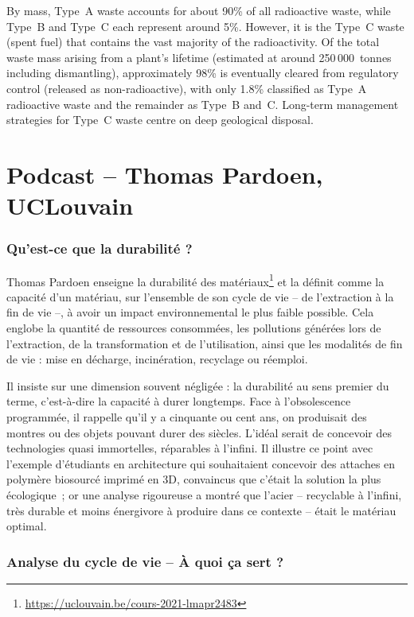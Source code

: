 By mass, Type~A waste accounts for about 90\% of all radioactive waste, while Type~B and Type~C each represent around 5\%. However, it is the Type~C waste (spent fuel) that contains the vast majority of the radioactivity. Of the total waste mass arising from a plant's lifetime (estimated at around 250\,000~tonnes including dismantling), approximately 98\% is eventually cleared from regulatory control (released as non-radioactive), with only 1.8\% classified as Type~A radioactive waste and the remainder as Type~B and~C. Long-term management strategies for Type~C waste centre on deep geological disposal.


\section{Podcast -- Thomas Pardoen, UCLouvain}

\subsubsection{Qu'est-ce que la durabilité ?}

Thomas Pardoen enseigne la durabilité des matériaux\footnote{\url{https://uclouvain.be/cours-2021-lmapr2483}} et la définit comme la capacité d'un matériau, sur l'ensemble de son cycle de vie -- de l'extraction à la fin de vie --, à avoir un impact environnemental le plus faible possible. Cela englobe la quantité de ressources consommées, les pollutions générées lors de l'extraction, de la transformation et de l'utilisation, ainsi que les modalités de fin de vie : mise en décharge, incinération, recyclage ou réemploi.

Il insiste sur une dimension souvent négligée : la durabilité au sens premier du terme, c'est-à-dire la capacité à durer longtemps. Face à l'obsolescence programmée, il rappelle qu'il y a cinquante ou cent ans, on produisait des montres ou des objets pouvant durer des siècles. L'idéal serait de concevoir des technologies quasi immortelles, réparables à l'infini. Il illustre ce point avec l'exemple d'étudiants en architecture qui souhaitaient concevoir des attaches en polymère biosourcé imprimé en 3D, convaincus que c'était la solution la plus écologique~; or une analyse rigoureuse a montré que l'acier -- recyclable à l'infini, très durable et moins énergivore à produire dans ce contexte -- était le matériau optimal.

\subsubsection{Analyse du cycle de vie -- À quoi ça sert ?}

